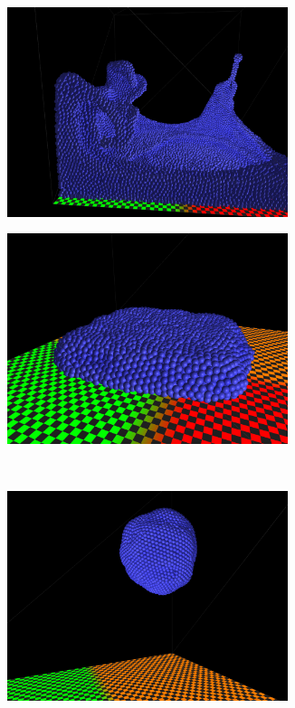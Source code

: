 \begin{figure}[H]
\centering
\begin{subfigure}{.5\textwidth}
  \centering
  \includegraphics[width=0.9\textwidth]{img/eVorticity100.png}
  \caption{}
\end{subfigure}%
\begin{subfigure}{.5\textwidth}
  \centering
  \includegraphics[width=0.9\textwidth]{img/cViscosity001.png}
  \caption{}
\end{subfigure}%
\\
\centering
\begin{subfigure}{.5\textwidth}
  \centering
  \includegraphics[width=0.9\textwidth]{img/gravity0.png}

\end{subfigure}
\end{figure}
